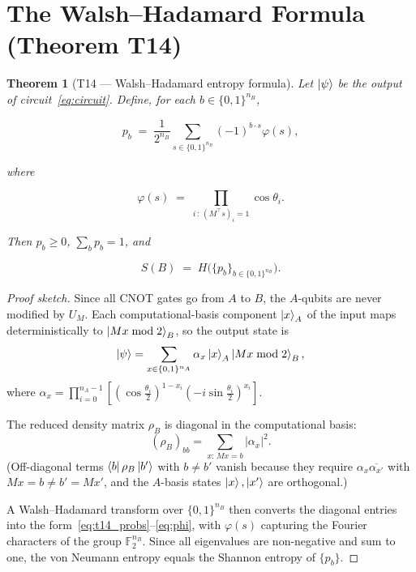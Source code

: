 \documentclass[11pt,a4paper]{article}
\newtheorem{theorem}{Theorem}[section]
\newcommand{\F}{\mathbb{F}}
\newcommand{\Hbin}{H}
\newcommand{\VNE}{S}
\begin{document}
\section{The Walsh--Hadamard Formula (Theorem T14)}
\label{sec:t14}

\begin{theorem}[T14 --- Walsh--Hadamard entropy formula]
\label{thm:t14}
Let $\ket{\psi}$ be the output of circuit~\eqref{eq:circuit}.  Define,
for each $b \in \{0,1\}^{n_B}$,

\begin{equation}
  p_b \;=\; \frac{1}{2^{n_B}}
            \sum_{s \in \{0,1\}^{n_B}}
            (-1)^{b \cdot s}
            \varphi(s),
  \label{eq:t14_probs}
\end{equation}

where

\begin{equation}
  \varphi(s) \;=\; \prod_{i \,:\, (M^{\top}s)_i = 1} \cos\theta_i.
  \label{eq:phi}
\end{equation}

Then $p_b \geq 0$, $\sum_b p_b = 1$, and

\begin{equation}
  \boxed{\VNE(B) \;=\; \Hbin\!\bigl(\{p_b\}_{b \in \{0,1\}^{n_B}}\bigr).}
  \label{eq:t14}
\end{equation}
\end{theorem}

\begin{proof}[Proof sketch]
Since all CNOT gates go from $A$ to $B$, the $A$-qubits are never modified
by $U_M$.  Each computational-basis component $\ket{x}_A$ of the input maps
deterministically to $\ket{Mx \bmod 2}_B$, so the output state is
\[
  \ket{\psi} = \sum_{x \in \{0,1\}^{n_A}} \alpha_x \ket{x}_A \ket{Mx \bmod 2}_B,
\]
where $\alpha_x = \prod_{i=0}^{n_A-1}[(\cos\tfrac{\theta_i}{2})^{1-x_i}(-i\sin\tfrac{\theta_i}{2})^{x_i}]$.

The reduced density matrix $\rho_B$ is diagonal in the computational basis:
\[
  (\rho_B)_{bb} = \sum_{x:\, Mx = b} |\alpha_x|^2.
\]
(Off-diagonal terms $\bra{b}\rho_B\ket{b'}$ with $b \neq b'$ vanish because
they require $\alpha_x \overline{\alpha_{x'}}$ with $Mx = b \neq b' = Mx'$,
and the $A$-basis states $\ket{x}, \ket{x'}$ are orthogonal.)

A Walsh--Hadamard transform over $\{0,1\}^{n_B}$ then converts the diagonal
entries into the form~\eqref{eq:t14_probs}--\eqref{eq:phi}, with $\varphi(s)$
capturing the Fourier characters of the group $\F_2^{n_B}$.  Since all
eigenvalues are non-negative and sum to one, the von Neumann entropy equals
the Shannon entropy of $\{p_b\}$.
\end{proof}
\end{document}
